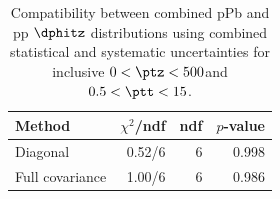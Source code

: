 \begin{table}[htp!]
\centering
\begin{tabular}{|l|r|r|r|}
\hline
Method & $\chi^2$/ndf & ndf & $p$-value \\
\hline
Diagonal & 0.52/6 & 6 & 0.998 \\
Full covariance & 1.00/6 & 6 & 0.986 \\
\hline
\end{tabular}
\caption{Compatibility between combined pPb and pp $\dphitz$ distributions using combined statistical and systematic uncertainties for inclusive $0 < \ptz < 500$\GeV and $0.5 < \ptt < 15$\GeV.}
\label{table:chisq_dphi}
\end{table}
